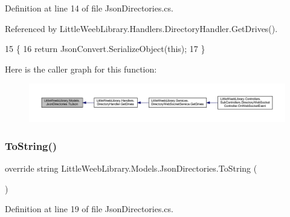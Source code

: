 Definition at line 14 of file Json\+Directories.\+cs.



Referenced by Little\+Weeb\+Library.\+Handlers.\+Directory\+Handler.\+Get\+Drives().


\begin{DoxyCode}
15         \{
16             \textcolor{keywordflow}{return} JsonConvert.SerializeObject(\textcolor{keyword}{this});
17         \}
\end{DoxyCode}
Here is the caller graph for this function\+:\nopagebreak
\begin{figure}[H]
\begin{center}
\leavevmode
\includegraphics[width=350pt]{class_little_weeb_library_1_1_models_1_1_json_directories_a06826e97f8dd170ecad5574cf8ef816a_icgraph}
\end{center}
\end{figure}
\mbox{\label{class_little_weeb_library_1_1_models_1_1_json_directories_aef343d105a3881b4c144dc557aaf76dc}} 
\subsubsection{\texorpdfstring{To\+String()}{ToString()}}
{\footnotesize\ttfamily override string Little\+Weeb\+Library.\+Models.\+Json\+Directories.\+To\+String (\begin{DoxyParamCaption}{ }\end{DoxyParamCaption})}



Definition at line 19 of file Json\+Directories.\+cs.


